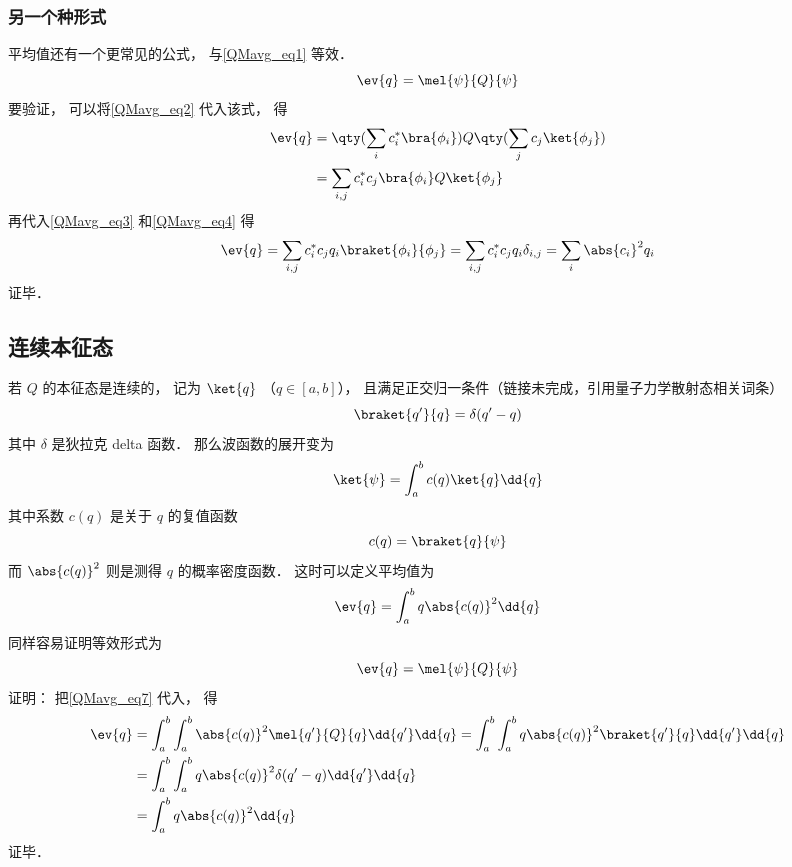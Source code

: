 \subsubsection{另一个种形式}
平均值还有一个更常见的公式， 与\autoref{QMavg_eq1} 等效．
\begin{equation}\label{QMavg_eq5}
\ev{q} = \mel{\psi}{Q}{\psi}
\end{equation}
要验证， 可以将\autoref{QMavg_eq2} 代入该式， 得
\begin{equation}
\begin{aligned}
\ev{q} &= \qty(\sum_i c_i^* \bra{\phi_i}) Q \qty(\sum_j c_j \ket{\phi_j})\\
&= \sum_{i,j} c_i^* c_j \bra{\phi_i} Q \ket{\phi_j}
\end{aligned} 
\end{equation}
再代入\autoref{QMavg_eq3} 和\autoref{QMavg_eq4} 得
\begin{equation}
\ev{q} = \sum_{i,j} c_i^* c_j q_i \braket{\phi_i}{\phi_j}
= \sum_{i,j} c_i^* c_j q_i \delta_{i,j} = \sum_i \abs{c_i}^2 q_i
\end{equation}
证毕．

\subsection{连续本征态}

若 $Q$ 的本征态是连续的， 记为 $\ket{q}$ （$q\in [a,b]$）， 且满足正交归一条件（链接未完成，引用量子力学散射态相关词条）
\begin{equation}\label{QMavg_eq9}
\braket{q'}{q} = \delta(q'-q)
\end{equation}
其中 $\delta$ 是狄拉克 delta 函数． 那么波函数的展开变为
\begin{equation}\label{QMavg_eq7}
\ket{\psi} = \int_a^b c(q) \ket{q} \dd{q}
\end{equation}
其中系数 $c(q)$ 是关于 $q$ 的复值函数
\begin{equation}\label{QMavg_eq10}
c(q) = \braket{q}{\psi}
\end{equation}
而 $\abs{c(q)}^2$ 则是测得 $q$ 的概率密度函数． 这时可以定义平均值为
\begin{equation}\label{QMavg_eq11}
\ev{q} = \int_a^b q \abs{c(q)}^2 \dd{q}
\end{equation}
同样容易证明等效形式为
\begin{equation}
\ev{q} = \mel{\psi}{Q}{\psi}
\end{equation}
证明： 把\autoref{QMavg_eq7} 代入， 得
\begin{equation}
\begin{aligned}
\ev{q} &= \int_a^b\int_a^b \abs{c(q)}^2\mel{q'}{Q}{q} \dd{q'}\dd{q} = \int_a^b\int_a^b q\abs{c(q)}^2\braket{q'}{q} \dd{q'}\dd{q}\\
&= \int_a^b\int_a^b q\abs{c(q)}^2\delta(q'-q) \dd{q'}\dd{q}\\
&= \int_a^b q\abs{c(q)}^2 \dd{q}
\end{aligned}
\end{equation}
证毕．

